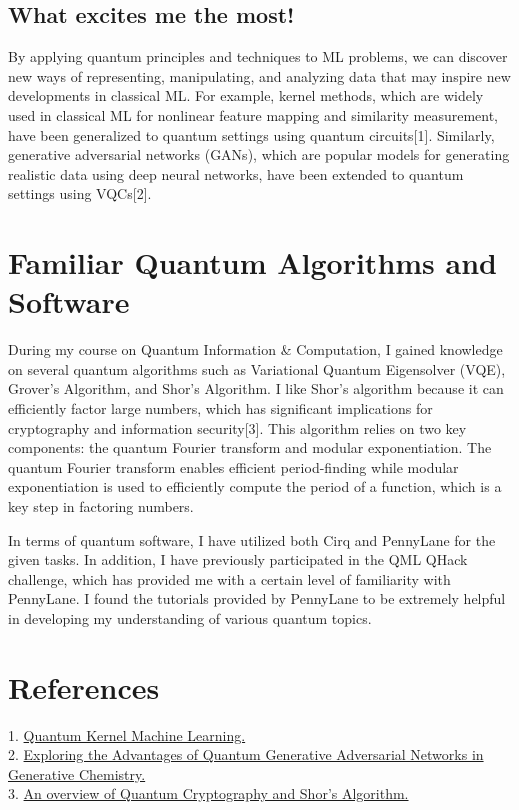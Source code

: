 \documentclass{article}
\begin{document}
\subsection{What excites me the most!}

By applying quantum principles and techniques to ML problems, we can discover new ways of representing, manipulating, and analyzing data that may inspire new developments in classical ML. For example, kernel methods, which are widely used in classical ML for nonlinear feature mapping and similarity measurement, have been generalized to quantum settings using quantum circuits[1]. Similarly, generative adversarial networks (GANs), which are popular models for generating realistic data using deep neural networks, have been extended to quantum settings using VQCs[2]. 

\section{Familiar Quantum Algorithms and Software}
During my course on Quantum Information \& Computation, I gained knowledge on several quantum algorithms such as Variational Quantum Eigensolver (VQE), Grover's Algorithm, and Shor's Algorithm. I like Shor's algorithm because it can efficiently factor large numbers, which has significant implications for cryptography and information security[3]. This algorithm relies on two key components: the quantum Fourier transform and modular exponentiation. The quantum Fourier transform enables efficient period-finding while modular exponentiation is used to efficiently compute the period of a function, which is a key step in factoring numbers.

In terms of quantum software, I have utilized both Cirq and PennyLane for the given tasks. In addition, I have previously participated in the QML QHack challenge, which has provided me with a certain level of familiarity with PennyLane. I found the tutorials provided by PennyLane to be extremely helpful in developing my understanding of various quantum topics.

\section{References}
1. 
\href{https://qiskit.org/documentation/machine-learning/tutorials/03_quantum_kernel.html}{Quantum Kernel Machine Learning.}
\\
2. 
\href{https://arxiv.org/abs/2210.16823}{Exploring the Advantages of Quantum Generative Adversarial Networks in Generative Chemistry.}
\\
3.
\href{https://www.academia.edu/77334349/An_overview_of_Quantum_Cryptography_and_Shor_s_Algorithm}{An overview of Quantum Cryptography and Shor’s Algorithm.}
\end{document}
